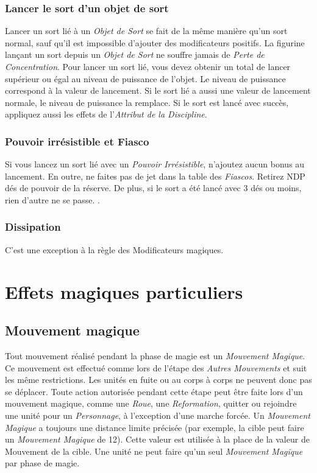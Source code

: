 \subsubsection*{Lancer le sort d'un objet de sort}
Lancer un sort lié à un \emph{Objet de Sort} se fait de la même manière qu'un sort normal, sauf qu'il est impossible d'ajouter des modificateurs positifs. La figurine lançant un sort depuis un \emph{Objet de Sort} ne souffre jamais de \emph{Perte de Concentration}. Pour lancer un sort lié, vous devez obtenir un total de lancer supérieur ou égal au niveau de puissance de l'objet. Le niveau de puissance correspond à la valeur de lancement. Si le sort lié a aussi une valeur de lancement normale, le niveau de puissance la remplace. Si le sort est lancé avec succès, appliquez aussi les effets de l'\emph{Attribut de la Discipline}.

\subsubsection*{Pouvoir irrésistible et Fiasco}
Si vous lancez un sort lié avec un \emph{Pouvoir Irrésistible}, n'ajoutez aucun bonus au lancement. En outre, ne faites pas de jet dans la table des \emph{Fiascos}. Retirez NDP dés de pouvoir de la réserve. De plus, si le sort a été lancé avec 3 dés ou moins, rien d'autre ne se passe. .

\subsubsection*{Dissipation}
 C'est une exception à la règle des Modificateurs magiques.

\section{Effets magiques particuliers}

\subsection{Mouvement magique}

Tout mouvement réalisé pendant la phase de magie est un \emph{Mouvement Magique}. Ce mouvement est effectué comme lors de l'étape des \emph{Autres Mouvements} et suit les même restrictions. Les unités en fuite ou au corps à corps ne peuvent donc pas se déplacer. Toute action autorisée pendant cette étape peut être faite lors d'un mouvement magique, comme une \emph{Roue}, une \emph{Reformation}, quitter ou rejoindre une unité pour un \emph{Personnage}, à l'exception d'une marche forcée. Un \emph{Mouvement Magique} a toujours une distance limite précisée (par exemple, la cible peut faire un \emph{Mouvement Magique} de \unit{12}{\pouce}). Cette valeur est utilisée à la place de la valeur de Mouvement de la cible. Une unité ne peut faire qu'un seul \emph{Mouvement Magique} par phase de magie.

